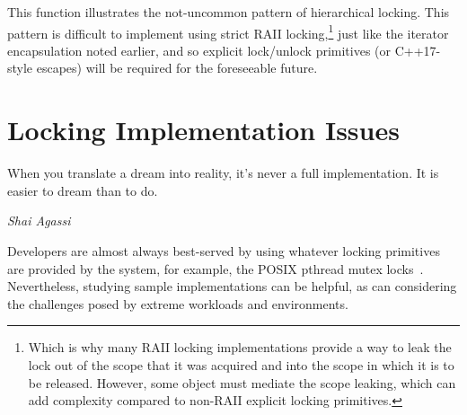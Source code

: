 
This function illustrates the not-uncommon pattern of hierarchical
locking.
This pattern is difficult to implement using strict RAII locking,\footnote{
	Which is why many RAII locking implementations provide a way
	to leak the lock out of the scope that it was acquired and into
	the scope in which it is to be released.
	However, some object must mediate the scope leaking, which can
	add complexity compared to non-RAII explicit locking primitives.}
just like the iterator encapsulation noted earlier, and so explicit
lock/unlock primitives (or C++17-style  escapes) will
be required for the foreseeable future.

\section{Locking Implementation Issues}
\label{sec:locking:Locking Implementation Issues}
%
\epigraph{When you translate a dream into reality, it's never a full
	  implementation.
	  It is easier to dream than to do.}
	 {\emph{Shai Agassi}}

Developers are almost always best-served by using whatever locking
primitives are provided by the system, for example, the POSIX
pthread mutex locks~\cite{OpenGroup1997pthreads,Butenhof1997pthreads}.
Nevertheless, studying sample implementations can be helpful,
as can considering the challenges posed by extreme workloads and
environments.

